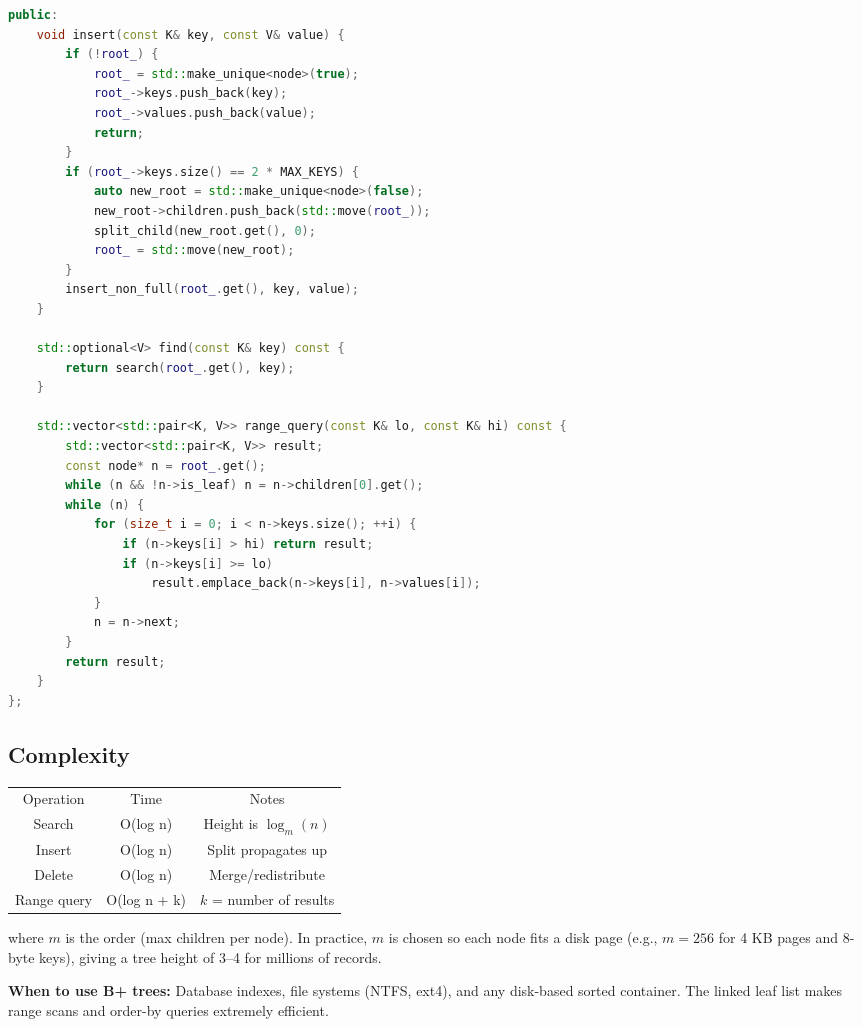 \begin{lstlisting}[language=C++]
public:
    void insert(const K& key, const V& value) {
        if (!root_) {
            root_ = std::make_unique<node>(true);
            root_->keys.push_back(key);
            root_->values.push_back(value);
            return;
        }
        if (root_->keys.size() == 2 * MAX_KEYS) {
            auto new_root = std::make_unique<node>(false);
            new_root->children.push_back(std::move(root_));
            split_child(new_root.get(), 0);
            root_ = std::move(new_root);
        }
        insert_non_full(root_.get(), key, value);
    }

    std::optional<V> find(const K& key) const {
        return search(root_.get(), key);
    }

    std::vector<std::pair<K, V>> range_query(const K& lo, const K& hi) const {
        std::vector<std::pair<K, V>> result;
        const node* n = root_.get();
        while (n && !n->is_leaf) n = n->children[0].get();
        while (n) {
            for (size_t i = 0; i < n->keys.size(); ++i) {
                if (n->keys[i] > hi) return result;
                if (n->keys[i] >= lo)
                    result.emplace_back(n->keys[i], n->values[i]);
            }
            n = n->next;
        }
        return result;
    }
};
\end{lstlisting}

\subsection{Complexity}

\begin{center}
\begin{tabular}{ccc}
\toprule
Operation & Time & Notes \\
Search & O(log n) & Height is $\log_{m}(n)$ \\
Insert & O(log n) & Split propagates up \\
Delete & O(log n) & Merge/redistribute \\
Range query & O(log n + k) & $k$ = number of results \\
\bottomrule
\end{tabular}
\end{center}

where $m$ is the order (max children per node). In practice, $m$ is chosen so each node fits a disk page (e.g., $m = 256$ for 4 KB pages and 8-byte keys), giving a tree height of 3--4 for millions of records.

\textbf{When to use B+ trees:} Database indexes, file systems (NTFS, ext4), and any disk-based sorted container. The linked leaf list makes range scans and order-by queries extremely efficient.

